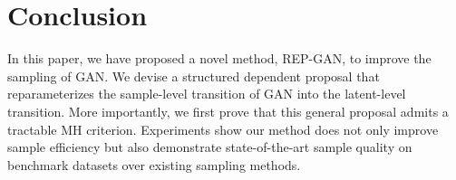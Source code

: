 \documentclass[runningheads]{llncs}
\newcommand{\<}{\left\langle}
\renewcommand{\>}{\right\rangle}
\begin{document}



\section{Conclusion}
In this paper, we have proposed a novel method, REP-GAN, to improve the sampling of GAN. We devise a structured dependent proposal that reparameterizes the sample-level transition of GAN into the latent-level transition. More importantly, we first prove that this general proposal admits a tractable MH criterion. 
Experiments show our method does not only improve sample efficiency but also demonstrate state-of-the-art sample quality on benchmark datasets over existing sampling methods.

% 
% 

%
%

\newpage



\end{document}
